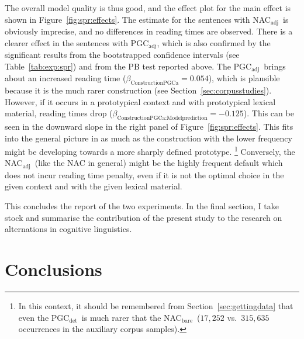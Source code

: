 \documentclass[USenglish]{article}
\newcommand{\Sub}[1]{\ensuremath{\mathrm{_{#1}}}}
\newcommand{\NACb}{NAC\Sub{bare}}
\newcommand{\NACa}{NAC\Sub{adj}}
\newcommand{\PGCd}{PGC\Sub{det}}
\newcommand{\PGCa}{PGC\Sub{adj}}
\begin{document}
The overall model quality is thus good, and the effect plot for the main effect is shown in Figure~\ref{fig:spr:effects}.
The estimate for the sentences with \NACa\ is obviously imprecise, and no differences in reading times are observed.
There is a clearer effect in the sentences with \PGCa, which is also confirmed by the significant results from the bootstrapped confidence intervals (see Table~\ref{tab:exp:spr}) and from the PB test reported above.
The \PGCa\ brings about an increased reading time ($\beta_{\text{ConstructionPGCa}}=0.054$), which is plausible because it is the much rarer construction (see Section~\ref{sec:corpusstudies}).
However, if it occurs in a prototypical context and with prototypical lexical material, reading times drop ($\beta_{\text{ConstructionPGCa:Modelprediction}}=-0.125$).
This can be seen in the downward slope in the right panel of Figure~\ref{fig:spr:effects}.
This fits into the general picture in as much as the construction with the lower frequency might be developing towards a more sharply defined prototype.%
\footnote{In this context, it should be remembered from Section~\ref{sec:gettingdata} that even the \PGCd\ is much rarer that the \NACb\ ($17,252$ vs.\ $315,635$ occurrences in the auxiliary corpus samples).}
Conversely, the \NACa\ (like the NAC in general) might be the highly frequent default which does not incur reading time penalty, even if it is not the optimal choice in the given context and with the given lexical material.

This concludes the report of the two experiments.
In the final section, I take stock and summarise the contribution of the present study to the research on alternations in cognitive linguistics.




\section{Conclusions}
\label{sec:conclusion}
\end{document}
